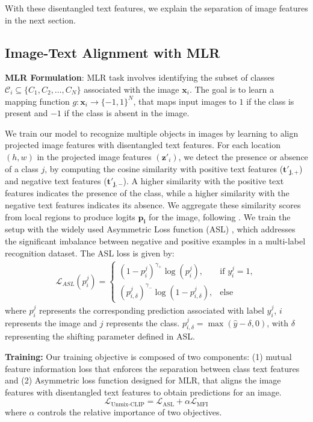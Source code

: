 With these disentangled text features, we explain the separation of image features in the next section.


\subsection{Image-Text Alignment with MLR}
\label{sec:Global Features - MLR}

\textbf{MLR Formulation}: MLR task involves identifying the subset of classes \(\mathcal{C}_i \subseteq \{C_1, C_2, \ldots, C_N\}\) associated with the image \(\mathbf{x}_i\). The goal is to learn a mapping function \(g: \mathbf{x}_i \rightarrow \{-1, 1\}^N\), that maps input images to \(1\) if the class is present and \(-1\) if the class is absent in the image. 


We train our model to recognize multiple objects in images by learning to align projected image features with disentangled text features. For each location $(h,w)$ in the projected image features $(\mathbf{z'}_i)$, we detect the presence or absence of a class $j$, by computing the cosine similarity with positive text features ($\mathbf{t'_{j,+}}$) and negative text features ($\mathbf{t'_{j,-}}$). A higher similarity with the positive text features indicates the presence of the class, while a higher similarity with the negative text features indicates its absence. We aggregate these similarity scores from local regions to produce logits $\mathbf{p_{i}}$ for the image, following \cite{dualcoop, MLR-GCN, PositiveCoOp}. We train the setup with the widely used Asymmetric Loss function (ASL) \cite{asl}, which addresses the significant imbalance between negative and positive examples in a multi-label recognition dataset. The ASL loss is given by:
% 
\begin{align}
    \mathcal{L}_{ASL}(p_{i}^{j}) = 
    \begin{cases} 
        \left(1 - p_{i}^{j}\right)^{\gamma_{+}} \log \left(p_{i}^{j}\right), & \text{if } y_{i}^{j} = 1, \\
        \left(p_{i, \delta}^{j}\right)^{\gamma_{-}} \log \left(1 - p_{i, \delta}^{j}\right), & \text{else }
    \end{cases} 
\label{eq:ASL}
\end{align}
% 
where $p_{i}^{j}$ represents the corresponding prediction associated with label $y_{i}^{j}$, $i$ represents the image and $j$ represents the class.  $p_{i, \delta}^{j} = \max(\hat{y} - \delta, 0)$, with $\delta$ representing the shifting parameter defined in ASL.
% 

\textbf{Training:}
Our training objective is composed of two components: (1) mutual feature information loss that enforces the separation between class text features and (2)  Asymmetric loss function \cite{asl} designed for MLR, that aligns the image features with disentangled text features to obtain predictions for an image.
% 
\begin{equation}
 \mathcal{L}_{\text{Unmix-CLIP}} =  \mathcal{L}_{\text{ASL}} + \alpha \mathcal{L}_{\text{MFI}}
\end{equation}
where 
\( \alpha \) controls the relative importance of two objectives.